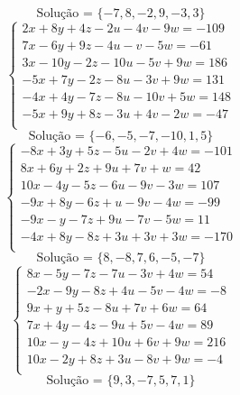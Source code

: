 \documentclass[12pt,oneside,a4paper]{article}
\begin{document}
\begin{equation*}
\text{Solução = }\{-7,8,-2,9,-3,3\}
\end{equation*}
\vspace{\baselineskip}
\begin{equation*}
\begin{cases}
2x+8y+4z-2u-4v-9w=-109 \\
7x-6y+9z-4u-v-5w=-61 \\
3x-10y-2z-10u-5v+9w=186 \\
-5x+7y-2z-8u-3v+9w=131 \\
-4x+4y-7z-8u-10v+5w=148 \\
-5x+9y+8z-3u+4v-2w=-47 \\
\end{cases}
\end{equation*}
\begin{equation*}
\text{Solução = }\{-6,-5,-7,-10,1,5\}
\end{equation*}
\vspace{\baselineskip}
\begin{equation*}
\begin{cases}
-8x+3y+5z-5u-2v+4w=-101 \\
8x+6y+2z+9u+7v+w=42 \\
10x-4y-5z-6u-9v-3w=107 \\
-9x+8y-6z+u-9v-4w=-99 \\
-9x-y-7z+9u-7v-5w=11 \\
-4x+8y-8z+3u+3v+3w=-170 \\
\end{cases}
\end{equation*}
\begin{equation*}
\text{Solução = }\{8,-8,7,6,-5,-7\}
\end{equation*}
\vspace{\baselineskip}
\begin{equation*}
\begin{cases}
8x-5y-7z-7u-3v+4w=54 \\
-2x-9y-8z+4u-5v-4w=-8 \\
9x+y+5z-8u+7v+6w=64 \\
7x+4y-4z-9u+5v-4w=89 \\
10x-y-4z+10u+6v+9w=216 \\
10x-2y+8z+3u-8v+9w=-4 \\
\end{cases}
\end{equation*}
\begin{equation*}
\text{Solução = }\{9,3,-7,5,7,1\}
\end{equation*}
\end{document}
